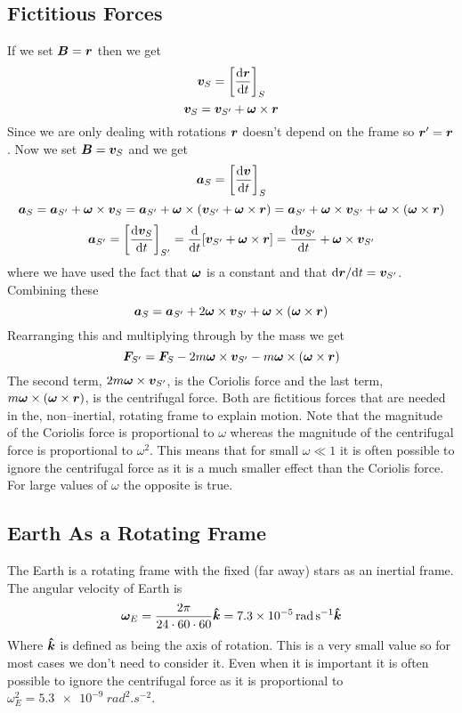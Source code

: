 \documentclass{article}
\newcommand{\vk}{\vh k}
\begin{document}
    \subsection{Fictitious Forces}
    If we set \(\bm{B} = \bm{r}\) then we get
    \[\bm{v}_S = \left[\dv{\bm{r}}{t}\right]_S\]
    \[\bm{v}_S = \bm{v}_{S'} + \bm{\omega}\times\bm{r}\]
    Since we are only dealing with rotations \(\bm{r}\) doesn't depend on the frame so \(\bm{r}' = \bm{r}\).
    Now we set \(\bm{B} = \bm{v}_S\) and we get
    \[\bm{a}_S = \left[\dv{\bm{v}}{t}\right]_S\]
    \[\bm{a}_S = \bm{a}_{S'} + \bm{\omega}\times\bm{v}_S = \bm{a}_{S'} + \bm{\omega}\times(\bm{v}_{S'} + \bm{\omega}\times\bm{r}) = \bm{a}_{S'} + \bm{\omega}\times\bm{v}_{S'} + \bm{\omega}\times(\bm{\omega}\times\bm{r})\]
    \[\bm{a}_{S'} = \left[\dv{\bm{v}_S}{t}\right]_{S'} = \dv{t}[\bm{v}_{S'} + \bm{\omega}\times\bm{r}] = \dv{\bm{v}_{S'}}{t} + \bm{\omega}\times\bm{v}_{S'}\]
    where we have used the fact that \(\bm{\omega}\) is a constant and that \(\dd\bm{r}/\dd t = \bm{v}_{S'}\).
    Combining these
    \[\bm{a}_S = \bm{a}_{S'} + 2\bm{\omega}\times\bm{v}_{S'} + \bm{\omega}\times(\bm{\omega}\times\bm{r})\]
    Rearranging this and multiplying through by the mass we get
    \[\bm{F}_{S'} = \bm{F}_S - 2m\bm{\omega}\times\bm{v}_{S'} - m\bm{\omega}\times(\bm{\omega}\times\bm{r})\]
    The second term, \(2m\bm{\omega}\times\bm{v}_{S'}\), is the Coriolis force and the last term, \(m\bm{\omega}\times(\bm{\omega}\times\bm{r})\), is the centrifugal force.
    Both are fictitious forces that are needed in the, non--inertial, rotating frame to explain motion.
    Note that the magnitude of the Coriolis force is proportional to \(\omega\) whereas the magnitude of the centrifugal force is proportional to \(\omega^2\).
    This means that for small \(\omega\ll 1\) it is often possible to ignore the centrifugal force as it is a much smaller effect than the Coriolis force.
    For large values of \(\omega\) the opposite is true.
    
    \subsection{Earth As a Rotating Frame}
    The Earth is a rotating frame with the fixed (far away) stars as an inertial frame.
    The angular velocity of Earth is
    \[\vv\omega_E = \frac{2\pi}{24\cdot60\cdot60}\vk = \SI{7.3e-5}{rad.s^{-1}}\vk\]
    Where \(\vk\) is defined as being the axis of rotation.
    This is a very small value so for most cases we don't need to consider it.
    Even when it is important it is often possible to ignore the centrifugal force as it is proportional to \(\omega_E^2 = \SI{5.3e-9}{rad^2.s^{-2}}\).
    
\end{document}
